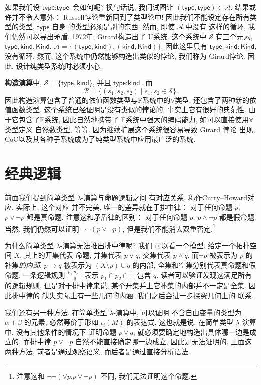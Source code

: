 \documentclass[UTF8]{ctexbook}
\newcommand{\cons}[1]{\textsf{#1}}
\theoremstyle{plain}
\theoremstyle{definition}
\theoremstyle{remark}
\begin{document}
如果我们设 \(\cons{type} : \cons{type}\) 会如何呢?
换句话说, 我们试图让 \((\cons{type}, \cons{type}) \in \mathcal A\).
结果或许并不令人意外： Russell悖论重新回到了类型论中!
因此我们不能设定存在所有类型的类型, \(\cons{type}\) 自身
的类型必须是别的东西. 然而, 即使 \(\mathcal A\) 中没有
这样的循环, 我们仍然可以导出矛盾. 1972年, Girard构造出了
U系统.
这个系统中 \(\mathcal S\) 有三个元素,
\(\cons{type}, \cons{kind}, \cons{Kind}\).
\(\mathcal A = \{(\cons{type}, \cons{kind}), (\cons{kind}, \cons{Kind})\}\).
因此这里只有 \(\cons{type} : \cons{kind} : \cons{Kind}\),
没有循环. 然而, 这个系统中仍然能够构造出类似的悖论, 我们称为
Girard悖论. 因此, 设计纯类型系统时必须小心.

\textbf{构造演算}中, \(\mathcal S = \{\cons{type}, \cons{kind}\}\),
并且 \(\cons{type} : \cons{kind}\). 而
\[\mathcal R = \{(s_1,s_2,s_2) \mid s_1, s_2 \in \mathcal S\}.\]
因此构造演算包含了普通的依值函数类型与F系统中的\(\forall\)类型,
还包含了两种新的依值函数类型. 这个系统已经证明是没有类似的悖论的.
事实上它有很好的典范性. 由于它包含了F系统, 因此自然地携带了
F系统中强大的编码能力, 如可以直接使用\(\forall\)类型定义
自然数类型, 等等. 因为继续扩展这个系统很容易导致 Girard 悖论
出现, CoC以及其各种子系统成为了纯类型系统中应用最广泛的系统.

\section{经典逻辑}

前面我们提到简单类型 \(\lambda\)-演算与命题逻辑之间
有对应关系, 称作Curry--Howard对应. 实际上, 这个对应
并不完美, 唯一的差异就在于排中律： 对于任何命题 \(p\),
\(p \vee \neg p\) 都是真命题. 注意这和矛盾律的区别：
对于任何命题 \(p\), \(p \wedge \neg p\) 都是假命题.
当然, 我们仍然可以证明 \(\neg \neg (p \vee \neg p)\),
但是我们不能消去双重否定.\footnote{注意这和
\(\neg\neg (\forall p. p \vee \neg p)\) 不同,
我们无法证明这个命题.}

为什么简单类型 \(\lambda\)-演算无法推出排中律呢? 我们
可以看一个模型. 给定一个拓扑空间 \(X\), 其上的开集代表
命题, 并集代表 \(p \vee q\), 交集代表 \(p \wedge q\).
而\(\neg p\) 被表示为 \(p\) 的补集\emph{的内部},
\(p \to q\) 被表示为 \((X \setminus p) \cup q\) 的内部,
全集和空集分别代表真命题和假命题. 一条逻辑规则
\(\frac{p_1~p_2 \cdots}{q}\) 表示 \(p_1 \cap p_2 \cap\cdots\) 包含 \(q\).
读者可以验证发现这满足所有的逻辑规则, 但是对于排中律来说,
某个开集并上它补集的内部并不一定是全集. 因此排中律的
缺失实际上有一些几何的内涵. 我们之后会进一步探究几何上的
联系.

我们还有另一种方法. 在简单类型 \(\lambda\)-演算中, 可以证明
不含自由变量的类型为 \(\alpha + \beta\) 的元素,
必然等价于形如 \(\iota_i(M)\) 的表达式. 这也就是说,
在简单类型 \(\lambda\)-演算中, 没有其他条件的情况下
证明命题 \(p\vee q\), 就必须要确定地构造出具体哪一边是成立的.
而排中律 \(p \vee \neg p\) 自然不能直接确定哪一边成立,
因此是无法证明的. 上面这两种方法, 前者是通过观察语义,
而后者是通过直接分析语法.
\end{document}

